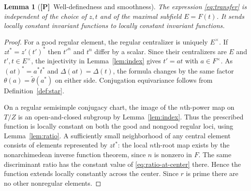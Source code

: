 \documentclass[11pt]{article}
\newcommand{\Ptag}{\textnormal{\textbf{[P]}}}
\theoremstyle{plain}
\newtheorem{lemma}[theorem]{Lemma}
\theoremstyle{definition}
\begin{document}
\begin{lemma}[\Ptag\ Well-definedness and smoothness]\label{lem:well-defined}
The expression \eqref{eq:transfer} is independent of the choice of $z,t$ and of the maximal subfield $E=F(t)$. It sends locally constant invariant functions to locally constant invariant functions.
\end{lemma}
\begin{proof}
For a good regular element, the regular centralizer is uniquely $E^\times$. If $zt^*=z'(t')^*$ then $t'^n$ and $t^n$ differ by a scalar. Since their centralizers are $E$ and $t',t\in E^\times$, the injectivity in Lemma~\ref{lem:index} gives $t'=at$ with $a\in F^\times$. As $(at)^*=a^*t^*$ and $\Delta(at)=\Delta(t)$, the formula changes by the same factor $\theta(a)=\widetilde\theta(a^*)$ on either side. Conjugation equivariance follows from Definition~\ref{def:star}.

On a regular semisimple conjugacy chart, the image of the $n$th-power map on $T/Z$ is an open-and-closed subgroup by Lemma~\ref{lem:index}. Thus the prescribed function is locally constant on both the good and nongood regular loci, using Lemma~\ref{lem:ratio}. A sufficiently small neighborhood of any central element consists of elements represented by $z t^*$: the local $n$th-root map exists by the nonarchimedean inverse function theorem, since $n$ is nonzero in $F$. The same discriminant ratio has the constant value of \eqref{eq:ratio-at-center} there. Hence the function extends locally constantly across the center. Since $r$ is prime there are no other nonregular elements.
\end{proof}
\end{document}
